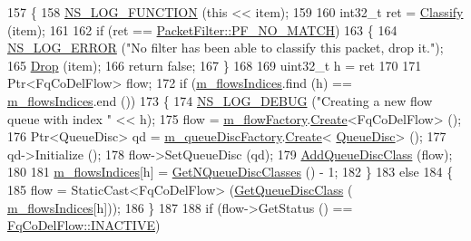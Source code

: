 \begin{DoxyCode}
157 \{
158   \hyperlink{log-macros-disabled_8h_a90b90d5bad1f39cb1b64923ea94c0761}{NS\_LOG\_FUNCTION} (\textcolor{keyword}{this} << item);
159 
160   int32\_t ret = \hyperlink{classns3_1_1QueueDisc_a560004f3fbca4e2cb9938fa3938f4be3}{Classify} (item);
161 
162   \textcolor{keywordflow}{if} (ret == \hyperlink{classns3_1_1PacketFilter_a5395721034f6c71a021436b928a0cd95}{PacketFilter::PF\_NO\_MATCH})
163     \{
164       \hyperlink{group__logging_ga0261a8db1d4ac5f79417d117634fd455}{NS\_LOG\_ERROR} (\textcolor{stringliteral}{"No filter has been able to classify this packet, drop it."});
165       \hyperlink{classns3_1_1QueueDisc_a4e8bbd3afbd927df3342dd015f30b08c}{Drop} (item);
166       \textcolor{keywordflow}{return} \textcolor{keyword}{false};
167     \}
168 
169   uint32\_t h = ret %
170 
171   Ptr<FqCoDelFlow> flow;
172   \textcolor{keywordflow}{if} (\hyperlink{classns3_1_1FqCoDelQueueDisc_a7ddb7f3d7e4f79c6e1c0cf3803423054}{m\_flowsIndices}.find (h) == \hyperlink{classns3_1_1FqCoDelQueueDisc_a7ddb7f3d7e4f79c6e1c0cf3803423054}{m\_flowsIndices}.end ())
173     \{
174       \hyperlink{group__logging_ga413f1886406d49f59a6a0a89b77b4d0a}{NS\_LOG\_DEBUG} (\textcolor{stringliteral}{"Creating a new flow queue with index "} << h);
175       flow = \hyperlink{classns3_1_1FqCoDelQueueDisc_a36344316002e616efd119c6a6985bfaa}{m\_flowFactory}.\hyperlink{classns3_1_1ObjectFactory_a18152e93f0a6fe184ed7300cb31e9896}{Create}<FqCoDelFlow> ();
176       Ptr<QueueDisc> qd = \hyperlink{classns3_1_1FqCoDelQueueDisc_a231b9b21c4ff12cdf57d2d386d1c5328}{m\_queueDiscFactory}.\hyperlink{classns3_1_1ObjectFactory_a18152e93f0a6fe184ed7300cb31e9896}{Create}<
      \hyperlink{classns3_1_1QueueDisc_a0e328ad3196b7d16783b8680722381d6}{QueueDisc}> ();
177       qd->Initialize ();
178       flow->SetQueueDisc (qd);
179       \hyperlink{classns3_1_1QueueDisc_a153f1f65efcaa976c9a93cd53b777416}{AddQueueDiscClass} (flow);
180 
181       \hyperlink{classns3_1_1FqCoDelQueueDisc_a7ddb7f3d7e4f79c6e1c0cf3803423054}{m\_flowsIndices}[h] = \hyperlink{classns3_1_1QueueDisc_a8165c6afde992b073bc4d3bb283ed138}{GetNQueueDiscClasses} () - 1;
182     \}
183   \textcolor{keywordflow}{else}
184     \{
185       flow = StaticCast<FqCoDelFlow> (\hyperlink{classns3_1_1QueueDisc_a584d228f7bff3f754d32793a38134556}{GetQueueDiscClass} (
      \hyperlink{classns3_1_1FqCoDelQueueDisc_a7ddb7f3d7e4f79c6e1c0cf3803423054}{m\_flowsIndices}[h]));
186     \}
187 
188   \textcolor{keywordflow}{if} (flow->GetStatus () == \hyperlink{classns3_1_1FqCoDelFlow_afbdbeaa5fc8659ada26a5d7f0e277b39a78fb27260b3ab5ae4be536a7c1db2648}{FqCoDelFlow::INACTIVE})

\end{DoxyCode}
